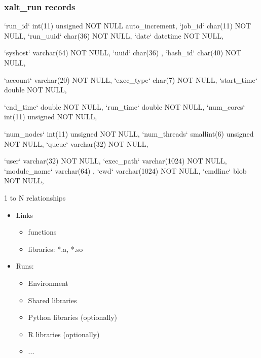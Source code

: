 \documentclass{beamer}
\begin{document}
\begin{frame}[fragile]
    \frametitle{xalt\_run records}
    {\tiny
\begin{semiverbatim}
   `run\_id`        int(11)     unsigned NOT NULL auto\_increment,
   `job\_id`        char(11)             NOT NULL,
   `run\_uuid`      char(36)             NOT NULL,
   `date`          datetime             NOT NULL,

   `syshost`       varchar(64)          NOT NULL,
   `uuid`          char(36)                     ,
   `hash\_id`       char(40)             NOT NULL,

   `account`       varchar(20)          NOT NULL,
   `exec\_type`     char(7)              NOT NULL,
   `start\_time`    double               NOT NULL,

   `end\_time`      double               NOT NULL,
   `run\_time`      double               NOT NULL,
   `num\_cores`     int(11)     unsigned NOT NULL,

   `num\_nodes`     int(11)     unsigned NOT NULL,
   `num\_threads`   smallint(6) unsigned NOT NULL,
   `queue`         varchar(32)          NOT NULL,

   `user`          varchar(32)          NOT NULL,
   `exec\_path`     varchar(1024)        NOT NULL,
   `module\_name`   varchar(64)                  ,
   `cwd`           varchar(1024)        NOT NULL,
   `cmdline`       blob                 NOT NULL,
\end{semiverbatim}
    }
\end{frame}

\begin{frame}{1 to N relationships}
  \begin{itemize}
    \item Links
      \begin{itemize}
        \item functions
        \item libraries: *.a, *.so
      \end{itemize}
    \item Runs:
      \begin{itemize}
        \item Environment
        \item Shared libraries
        \item Python libraries (optionally)
        \item R libraries (optionally)
        \item ...
      \end{itemize}
  \end{itemize}
\end{frame}
\end{document}
